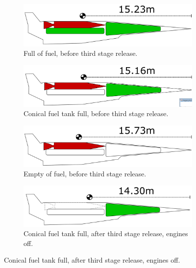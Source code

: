 		
		\begin{figure}
			\begin{subfigure}{.5\textwidth}
				\centering
				\includegraphics[width=0.9\linewidth]{figures/3_vehicle_design/CG1}
				\caption{Full of fuel, before third stage release.}
			\end{subfigure}
			\begin{subfigure}{.5\textwidth}
				\centering
				\includegraphics[width=0.9\linewidth]{figures/3_vehicle_design/CG2}
				\caption{Conical fuel tank full, before third stage release.}
				
			\end{subfigure}
			\begin{subfigure}{.5\textwidth}
				\centering
				\includegraphics[width=0.9\linewidth]{figures/3_vehicle_design/CG3}
				\caption{Empty of fuel, before third stage release.}
				
			\end{subfigure}
			\begin{subfigure}{.5\textwidth}
				\centering
				\includegraphics[width=0.9\linewidth]{figures/3_vehicle_design/CG4}
				\caption{Conical fuel tank full, after third stage release, engines off.}
				

\end{subfigure}
\end{figure}
